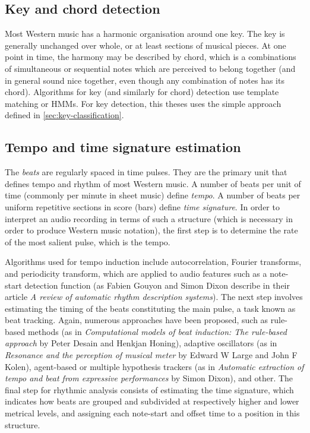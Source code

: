 \subsection{Key and chord detection}\label{subsec:key-and-chord-detection}
Most Western music has a harmonic organisation around one key. The key is generally unchanged over whole, or at least
sections of musical pieces. At one point in time, the harmony may be described by chord, which is a combinations of
simultaneous or sequential notes which are perceived to belong together (and in general sound nice together, even though
any combination of notes has its chord). Algorithms for key (and similarly for chord) detection use template matching or
\acp{HMM}. For key detection, this theses uses the simple approach defined in \cref{sec:key-classification}.

\subsection{Tempo and time signature estimation}\label{subsec:tempo-and-time-signature-estimation}
The \textit{beats} are regularly spaced in time pulses. They are the primary unit that defines tempo and rhythm of most
Western music. A number of beats per unit of time (commonly per minute in sheet music) define \textit{tempo}. A number
of beats per uniform repetitive sections in score (bars) define \textit{time signature}. In order to interpret an audio
recording in terms of such a structure (which is necessary in order to produce Western music notation), the first step
is to determine the rate of the most salient pulse, which is the tempo.

Algorithms used for tempo induction include autocorrelation, Fourier transforms, and periodicity transform, which are
applied to audio features such as a note-start detection function (as Fabien Gouyon and Simon Dixon describe in their
article \textit{A review of automatic rhythm description systems}\cite{gouyon2005review}). The next step involves
estimating the timing of the beats constituting the main pulse, a task known as beat tracking. Again, numerous
approaches have been proposed, such as rule-based methods (as in \textit{Computational models of beat induction:
The rule-based approach}\cite{desain1999computational} by Peter Desain and Henkjan Honing), adaptive oscillators (as
in \textit{Resonance and the perception of musical meter}\cite{large1994resonance} by Edward W Large and John F Kolen),
agent-based or multiple hypothesis trackers (as in \textit{Automatic extraction of tempo and beat from expressive
performances}\cite{dixon2001automatic} by Simon Dixon), and other. The final step for rhythmic analysis consists of
estimating the time signature, which indicates how beats are grouped and subdivided at respectively higher and lower
metrical levels, and assigning each note-start and offset time to a position in this structure\cite{cemgil2011monte}.

